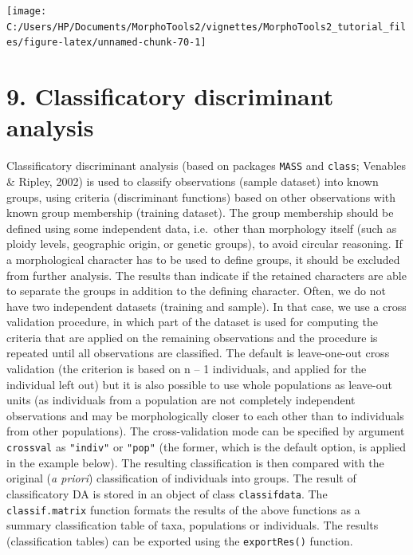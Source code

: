 \documentclass[
]{article}
\begin{document}
\begin{center}\texttt{[image: C:/Users/HP/Documents/MorphoTools2/vignettes/MorphoTools2\_tutorial\_files/figure-latex/unnamed-chunk-70-1]} \end{center}

\hypertarget{classificatory-discriminant-analysis}{%
\section{9. Classificatory discriminant
analysis}\label{classificatory-discriminant-analysis}}

Classificatory discriminant analysis (based on packages \texttt{MASS}
and \texttt{class}; Venables \& Ripley, 2002) is used to classify
observations (sample dataset) into known groups, using criteria
(discriminant functions) based on other observations with known group
membership (training dataset). The group membership should be defined
using some independent data, i.e.~other than morphology itself (such as
ploidy levels, geographic origin, or genetic groups), to avoid circular
reasoning. If a morphological character has to be used to define groups,
it should be excluded from further analysis. The results than indicate
if the retained characters are able to separate the groups in addition
to the defining character. Often, we do not have two independent
datasets (training and sample). In that case, we use a cross validation
procedure, in which part of the dataset is used for computing the
criteria that are applied on the remaining observations and the
procedure is repeated until all observations are classified. The default
is leave-one-out cross validation (the criterion is based on n -- 1
individuals, and applied for the individual left out) but it is also
possible to use whole populations as leave-out units (as individuals
from a population are not completely independent observations and may be
morphologically closer to each other than to individuals from other
populations). The cross-validation mode can be specified by argument
\texttt{crossval} as \texttt{"indiv"} or \texttt{"pop"} (the former,
which is the default option, is applied in the example below). The
resulting classification is then compared with the original (\emph{a
priori}) classification of individuals into groups. The result of
classificatory DA is stored in an object of class \texttt{classifdata}.
The \texttt{classif.matrix} function formats the results of the above
functions as a summary classification table of taxa, populations or
individuals. The results (classification tables) can be exported using
the \texttt{exportRes()} function.
\end{document}
